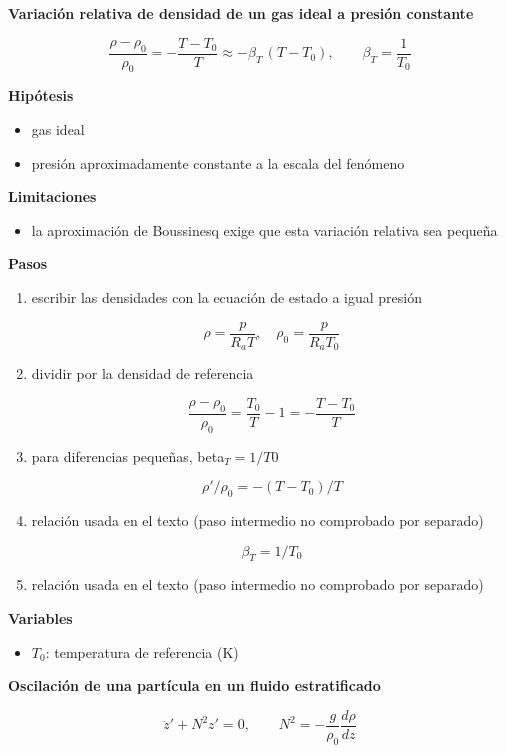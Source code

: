 \documentclass[10pt,openany]{book}
\begin{document}
\begin{tcolorbox}[title={Desarrollos del modelo}, studiumdef, breakable]

\noindent\textbf{Variación relativa de densidad de un gas ideal a presión constante}

\[
\frac{\rho - \rho_0}{\rho_0} = -\frac{T - T_0}{T} \approx -\beta_T\,(T - T_0),\qquad \beta_T = \frac{1}{T_0}
\]

\noindent\textbf{Hipótesis}
\begin{itemize}
\item gas ideal
\item presión aproximadamente constante a la escala del fenómeno
\end{itemize}

\noindent\textbf{Limitaciones}
\begin{itemize}
\item la aproximación de Boussinesq exige que esta variación relativa sea pequeña
\end{itemize}

\noindent\textbf{Pasos}
\begin{enumerate}
\item
escribir las densidades con la ecuación de estado a igual presión

\[
\rho = \frac{p}{R_a T},\quad \rho_0 = \frac{p}{R_a T_0}
\]
\item
dividir por la densidad de referencia

\[
\frac{\rho - \rho_0}{\rho_0} = \frac{T_0}{T} - 1 = -\frac{T - T_0}{T}
\]
\item
para diferencias pequeñas, beta\(_T = 1/T0\)

\[
\rho'/\rho_0 = -(T - T_0)/T
\]
\item
relación usada en el texto (paso intermedio no comprobado por separado)

\[
\beta_T = 1/T_0
\]
\item
relación usada en el texto (paso intermedio no comprobado por separado)
\end{enumerate}

\noindent\textbf{Variables}
\begin{itemize}
\item $T_{0}$: temperatura de referencia ($\mathrm{K}$)
\end{itemize}



\noindent\textbf{Oscilación de una partícula en un fluido estratificado}

\[
\ddot z' + N^{2} z' = 0,\qquad N^{2} = -\frac{g}{\rho_0}\frac{d\rho}{dz}
\]


\end{tcolorbox}
\end{document}
